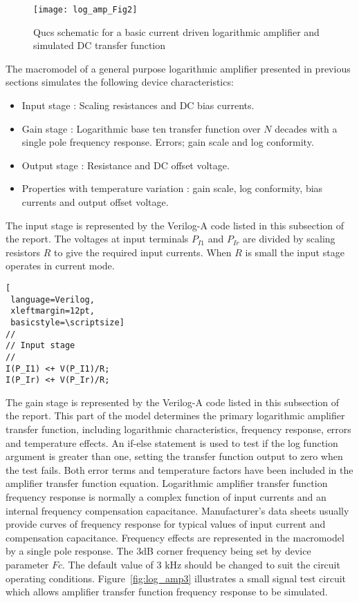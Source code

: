 \begin{figure}
  \centering
  \texttt{[image: log\_amp\_Fig2]}
  \caption{Qucs schematic for a basic current driven logarithmic amplifier and simulated DC transfer function}
  \label{fig:log_amp2}
\end{figure} 


The macromodel of a general purpose logarithmic amplifier presented in
previous sections simulates the following device characteristics:
\begin{itemize}
 \item Input stage  : Scaling resistances and DC bias currents.
 \item Gain  stage  : Logarithmic base ten transfer function over $N$ decades with a single pole frequency response. Errors; gain scale and log conformity.
 \item Output stage : Resistance and DC offset voltage.
 \item Properties with temperature variation : gain scale, log conformity, bias currents and output offset voltage.
\end{itemize}

The input stage is represented by the Verilog-A code listed in this subsection of the report. The voltages at input terminals $P_{I1}$ and $P_{Ir}$ are divided by scaling resistors $R$ to give the required input currents.  When $R$ is small the input stage operates in current mode. 

\begin{lstlisting}[
 language=Verilog, 
 xleftmargin=12pt,
 basicstyle=\scriptsize]
//
// Input stage
//
I(P_I1) <+ V(P_I1)/R;
I(P_Ir) <+ V(P_Ir)/R;

\end{lstlisting}


The gain stage is represented by the Verilog-A code listed in this
subsection of the report. This part of the model determines the
primary logarithmic amplifier transfer function, including logarithmic
characteristics, frequency response, errors and temperature
effects. An if-else statement is used to test if the log function
argument is greater than one, setting the transfer function output to
zero when the test fails. Both error terms and temperature factors
have been included in the amplifier transfer function
equation. Logarithmic amplifier transfer function frequency response
is normally a complex function of input currents and an internal
frequency compensation capacitance.  Manufacturer's data sheets
usually provide curves of frequency response for typical values of
input current and compensation capacitance. Frequency effects are
represented in the macromodel by a single pole response. The 3dB
corner frequency being set by device parameter $Fc$. The default value
of 3 kHz should be changed to suit the circuit operating conditions.
Figure~\ref{fig:log_amp3} illustrates a small signal test circuit
which allows amplifier transfer function frequency response to be
simulated.

